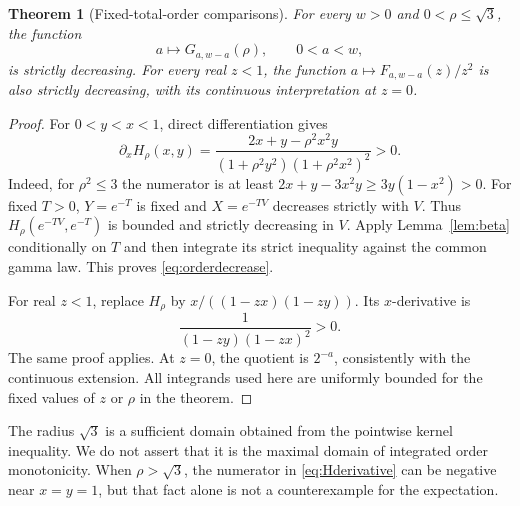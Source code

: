 \documentclass[11pt]{article}
\numberwithin{equation}{section}
\newtheorem{theorem}{Theorem}[section]
\theoremstyle{definition}\newtheorem{definition}[theorem]{Definition}
\theoremstyle{remark}\newtheorem{remark}[theorem]{Remark}
\begin{document}
\begin{theorem}[Fixed-total-order comparisons]\label{thm:monotonicity}
For every $w>0$ and $0<\rho\le\sqrt3$, the function
\begin{equation}\label{eq:orderdecrease}
 a\longmapsto G_{a,w-a}(\rho),\qquad 0<a<w,
\end{equation}
is strictly decreasing. For every real $z<1$, the function
$a\mapsto F_{a,w-a}(z)/z^2$ is also strictly decreasing, with its
continuous interpretation at $z=0$.
\end{theorem}
\begin{proof}
For $0<y<x<1$, direct differentiation gives
\begin{equation}\label{eq:Hderivative}
 \partial_xH_\rho(x,y)=
 \frac{2x+y-\rho^2x^2y}
 {(1+\rho^2y^2)(1+\rho^2x^2)^2}>0.
\end{equation}
Indeed, for $\rho^2\le3$ the numerator is at least
$2x+y-3x^2y\ge3y(1-x^2)>0$.
For fixed $T>0$, $Y=e^{-T}$ is fixed and $X=e^{-TV}$ decreases strictly
with $V$. Thus $H_\rho(e^{-TV},e^{-T})$ is bounded and strictly
decreasing in $V$. Apply Lemma~\ref{lem:beta} conditionally on $T$ and
then integrate its strict inequality against the common gamma law.
This proves \eqref{eq:orderdecrease}.

For real $z<1$, replace $H_\rho$ by
$x/((1-zx)(1-zy))$. Its $x$-derivative is
\[
 \frac1{(1-zy)(1-zx)^2}>0.
\]
The same proof applies. At $z=0$, the quotient is $2^{-a}$, consistently
with the continuous extension. All integrands used here are uniformly
bounded for the fixed values of $z$ or $\rho$ in the theorem.
\end{proof}

The radius $\sqrt3$ is a sufficient domain obtained from the pointwise
kernel inequality. We do not assert that it is the maximal domain of
integrated order monotonicity. When $\rho>\sqrt3$, the numerator in
\eqref{eq:Hderivative} can be negative near $x=y=1$, but that fact alone
is not a counterexample for the expectation.
\end{document}
